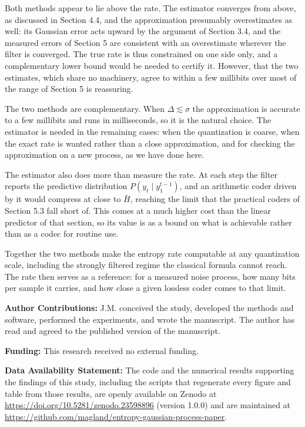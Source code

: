 \documentclass[11pt]{article}
\begin{document}
Both methods appear to lie above the rate. The estimator converges from above, as discussed in Section 4.4, and the approximation presumably overestimates as well: its Gaussian error acts upward by the argument of Section 3.4, and the measured errors of Section 5 are consistent with an overestimate wherever the filter is converged. The true rate is thus constrained on one side only, and a complementary lower bound would be needed to certify it. However, that the two estimates, which share no machinery, agree to within a few millibits over most of the range of Section 5 is reassuring.

The two methods are complementary. When \(\Delta \lesssim \sigma\) the approximation is accurate to a few millibits and runs in milliseconds, so it is the natural choice. The estimator is needed in the remaining cases: when the quantization is coarse, when the exact rate is wanted rather than a close approximation, and for checking the approximation on a new process, as we have done here.

The estimator also does more than measure the rate. At each step the filter reports the predictive distribution \(P(y_t \mid y_1^{t-1})\), and an arithmetic coder driven by it would compress at close to \(\bar H\), reaching the limit that the practical coders of Section 5.3 fall short of. This comes at a much higher cost than the linear predictor of that section, so its value is as a bound on what is achievable rather than as a codec for routine use.

Together the two methods make the entropy rate computable at any quantization scale, including the strongly filtered regime the classical formula cannot reach. The rate then serves as a reference: for a measured noise process, how many bits per sample it carries, and how close a given lossless coder comes to that limit.

\vspace{6pt}
\noindent\textbf{Author Contributions:} J.M. conceived the study, developed the methods and software, performed the experiments, and wrote the manuscript. The author has read and agreed to the published version of the manuscript.

\medskip
\noindent\textbf{Funding:} This research received no external funding.

\medskip
\noindent\textbf{Data Availability Statement:} The code and the numerical results supporting the findings of this study, including the scripts that regenerate every figure and table from those results, are openly available on Zenodo at \url{https://doi.org/10.5281/zenodo.23598896} (version 1.0.0) and are maintained at \url{https://github.com/magland/entropy-gaussian-process-paper}.
\end{document}
